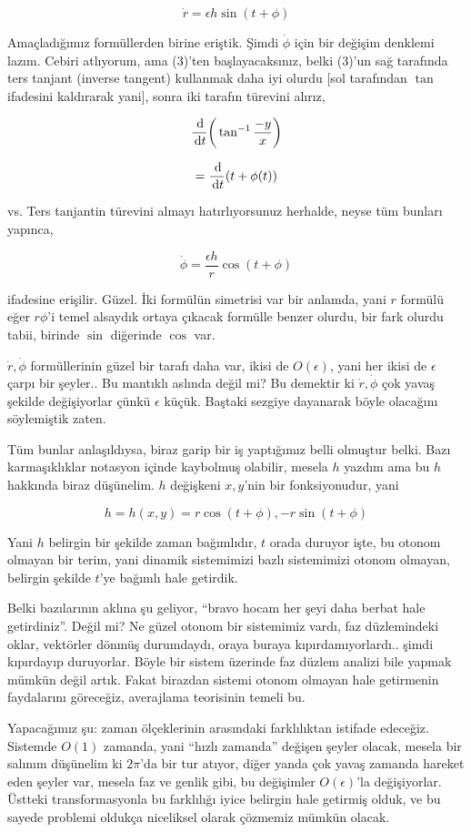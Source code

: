 \documentclass[12pt,fleqn]{article}\usepackage{../../common}
\begin{document}
$$ \dot{r} = \epsilon h \sin(t+\phi) $$

Amaçladığımız formüllerden birine eriştik. Şimdi $\dot{\phi}$ için bir değişim
denklemi lazım. Cebiri atlıyorum, ama (3)'ten başlayacaksınız, belki (3)'un sağ
tarafında ters tanjant (inverse tangent) kullanmak daha iyi olurdu [sol
  tarafından $\tan$ ifadesini kaldırarak yani], sonra iki tarafın türevini
alırız,

$$ \frac{\,\mathrm{d}}{\,\mathrm{d} t} \bigg( \tan^{-1} \frac{-y}{x} \bigg) $$

$$ = \frac{\,\mathrm{d}}{\,\mathrm{d} t} (t+\phi(t)) $$

vs. Ters tanjantin türevini almayı hatırlıyorsunuz herhalde, neyse tüm bunları
yapınca,

$$ \dot{\phi} = \frac{\epsilon h}{r} \cos(t+\phi) $$

ifadesine erişilir. Güzel. İki formülün simetrisi var bir anlamda, yani $r$
formülü eğer $r\phi$'i temel alsaydık ortaya çıkacak formülle benzer olurdu,
bir fark olurdu tabii, birinde $\sin$ diğerinde $\cos$ var.

$\dot{r},\dot{\phi}$ formüllerinin güzel bir tarafı daha var, ikisi de
$O(\epsilon)$, yani her ikisi de $\epsilon$ çarpı bir şeyler.. Bu mantıklı
aslında değil mi? Bu demektir ki $\dot{r},\dot{\phi}$ çok yavaş şekilde
değişiyorlar çünkü $\epsilon$ küçük. Baştaki sezgiye dayanarak böyle olacağını
söylemiştik zaten. 

Tüm bunlar anlaşıldıysa, biraz garip bir iş yaptığımız belli olmuştur
belki. Bazı karmaşıklıklar notasyon içinde kaybolmuş olabilir, mesela $h$ yazdım
ama bu $h$ hakkında biraz düşünelim. $h$ değişkeni $x,y$'nin bir fonksiyonudur,
yani

$$ h = h(x,y) = r\cos(t+\phi), -r\sin(t+\phi) $$

Yani $h$ belirgin bir şekilde zaman bağımlıdır, $t$ orada duruyor işte, bu
otonom olmayan bir terim, yani dinamik sistemimizi bazlı sistemimizi otonom
olmayan, belirgin şekilde $t$'ye bağımlı hale getirdik.

Belki bazılarının aklına şu geliyor, ``bravo hocam her şeyi daha berbat hale
getirdiniz''. Değil mi? Ne güzel otonom bir sistemimiz vardı, faz düzlemindeki
oklar, vektörler dönmüş durumdaydı, oraya buraya kıpırdamıyorlardı.. şimdi
kıpırdayıp duruyorlar. Böyle bir sistem üzerinde faz düzlem analizi bile yapmak
mümkün değil artık. Fakat birazdan sistemi otonom olmayan hale getirmenin
faydalarını göreceğiz, averajlama teorisinin temeli bu.

Yapacağımız şu: zaman ölçeklerinin arasındaki farklılıktan istifade
edeceğiz. Sistemde $O(1)$ zamanda, yani ``hızlı zamanda'' değişen şeyler olacak,
mesela bir salınım düşünelim ki $2\pi$'da bir tur atıyor, diğer yanda çok yavaş
zamanda hareket eden şeyler var, mesela faz ve genlik gibi, bu değişimler
$O(\epsilon)$'la değişiyorlar. Üstteki transformasyonla bu farklılığı iyice
belirgin hale getirmiş olduk, ve bu sayede problemi oldukça niceliksel olarak
çözmemiz mümkün olacak.
\end{document}
